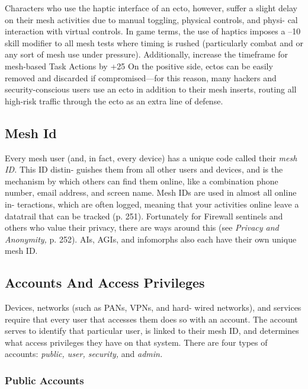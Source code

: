 Characters who use the haptic interface of an ecto, 
however, suffer a slight delay on their mesh activities 
due to manual toggling, physical controls, and physi-
cal interaction with virtual controls. In game terms, 
the use of haptics imposes a –10 skill modifier  to 
all mesh tests where timing is rushed (particularly 
combat and or any sort of mesh use under pressure). 
Additionally, increase the timeframe for mesh-based 
Task Actions by +25%
On the positive side, ectos can be easily removed and 
discarded if compromised—for this reason, many 
hackers and security-conscious users use an ecto in 
addition to their mesh inserts, routing all high-risk 
traffic through the ecto as an extra line of defense.

\subsection{Mesh Id}

Every mesh user (and, in fact, every device) has a 
unique code called their \textit{mesh ID.} This ID distin-
guishes them from all other users and devices, and is 
the mechanism by which others can find them online, 
like a combination phone number, email address, and 
screen name. Mesh IDs are used in almost all online in-
teractions, which are often logged, meaning that your 
activities online leave a datatrail that can be tracked 
(p. 251). Fortunately for Firewall sentinels and others 
who value their privacy, there are ways around this 
(see \textit{Privacy and Anonymity,} p. 252). AIs, AGIs, and 
infomorphs also each have their own unique mesh ID.

\subsection{Accounts And Access Privileges}

Devices, networks (such as PANs, VPNs, and hard-
wired networks), and services require that every user 
that accesses them does so with an account. The 
account serves to identify that particular user, is 
linked to their mesh ID, and determines what access 
privileges they have on that system. There are four 
types of accounts: \textit{public, user, security,} and \textit{admin.}

\subsubsection{Public Accounts}

